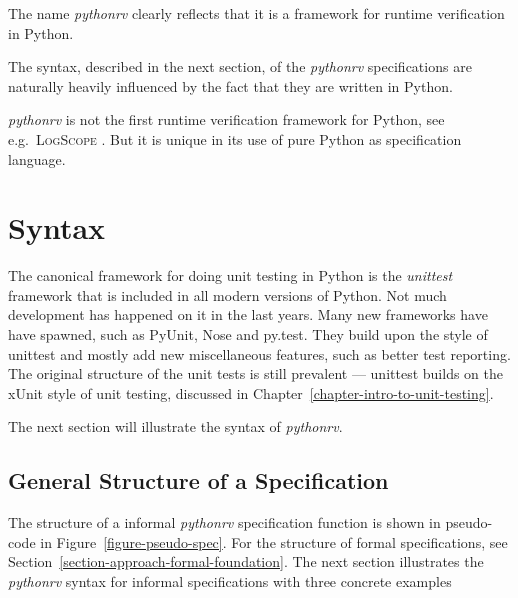 \documentclass[a4paper,11pt]{kth-mag}
\begin{document}
The name \textit{pythonrv} clearly reflects that it is a framework for runtime
verification in Python.

The syntax, described in the next section, of the \textit{pythonrv}
specifications are naturally heavily influenced by the fact that they are
written in Python.

\textit{pythonrv} is not the first runtime verification framework for Python,
see e.g.\ \textsc{LogScope} \cite{barringer09tutorial}. But it is unique in its
use of pure Python as specification language.


\section{Syntax} \label{section-approach-syntax}

The canonical framework for doing unit testing in Python is the
\textit{unittest} framework that is included in all modern versions of Python.
Not much development has happened on it in the last years. Many new frameworks
have have spawned, such as PyUnit, Nose and py.test. They build upon the style
of unittest and mostly add new miscellaneous features, such as better test
reporting. The original structure of the unit tests is still prevalent ---
unittest builds on the xUnit style of unit testing, discussed in
Chapter~\ref{chapter-intro-to-unit-testing}.

The next section will illustrate the syntax of \textit{pythonrv}.

\subsection{General Structure of a Specification}

The structure of a informal \textit{pythonrv} specification function is shown
in pseudo-code in Figure~\ref{figure-pseudo-spec}. For the structure of formal
specifications, see Section~\ref{section-approach-formal-foundation}. The next
section illustrates the \textit{pythonrv} syntax for informal specifications
with three concrete examples
\end{document}
